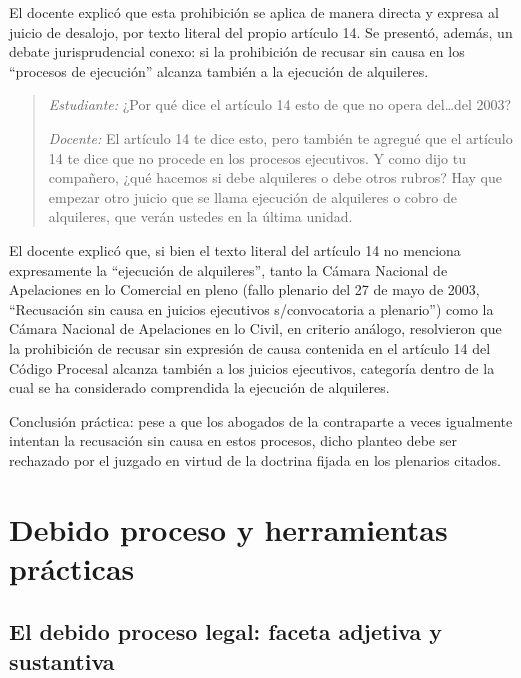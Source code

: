 \documentclass[12pt,oneside]{book}
\begin{document}
El docente explicó que esta prohibición se aplica de manera directa y expresa al juicio de desalojo, por texto literal del propio artículo 14. Se presentó, además, un debate jurisprudencial conexo: si la prohibición de recusar sin causa en los ``procesos de ejecución'' alcanza también a la ejecución de alquileres.

\begin{quote}
\textit{Estudiante:} ¿Por qué dice el artículo 14 esto de que no opera del\ldots del 2003?

\textit{Docente:} El artículo 14 te dice esto, pero también te agregué que el artículo 14 te dice que no procede en los procesos ejecutivos. Y como dijo tu compañero, ¿qué hacemos si debe alquileres o debe otros rubros? Hay que empezar otro juicio que se llama ejecución de alquileres o cobro de alquileres, que verán ustedes en la última unidad.
\end{quote}

\begin{note}
El docente explicó que, si bien el texto literal del artículo 14 no menciona expresamente la ``ejecución de alquileres'', tanto la Cámara Nacional de Apelaciones en lo Comercial en pleno (fallo plenario del 27 de mayo de 2003, ``Recusación sin causa en juicios ejecutivos s/convocatoria a plenario'') como la Cámara Nacional de Apelaciones en lo Civil, en criterio análogo, resolvieron que la prohibición de recusar sin expresión de causa contenida en el artículo 14 del Código Procesal alcanza también a los juicios ejecutivos, categoría dentro de la cual se ha considerado comprendida la ejecución de alquileres.

Conclusión práctica: pese a que los abogados de la contraparte a veces igualmente intentan la recusación sin causa en estos procesos, dicho planteo debe ser rechazado por el juzgado en virtud de la doctrina fijada en los plenarios citados.
\end{note}

\chapter{Debido proceso y herramientas prácticas}

\section{El debido proceso legal: faceta adjetiva y sustantiva}
\end{document}
